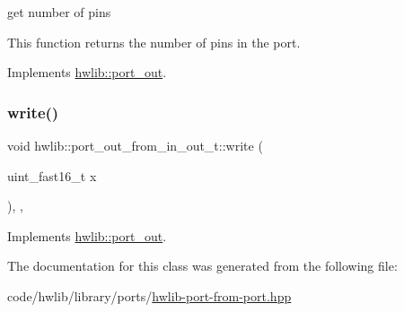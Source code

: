 get number of pins

This function returns the number of pins in the port. 

Implements \hyperlink{classhwlib_1_1port__out_a8593e2ff755b938797defb06c1e085df}{hwlib\+::port\+\_\+out}.

\mbox{\label{classhwlib_1_1port__out__from__in__out__t_acc2b58e61226bcf46f7f4c30c94084ee}} 
\subsubsection{\texorpdfstring{write()}{write()}}
{\footnotesize\ttfamily void hwlib\+::port\+\_\+out\+\_\+from\+\_\+in\+\_\+out\+\_\+t\+::write (\begin{DoxyParamCaption}\item[{uint\+\_\+fast16\+\_\+t}]{x }\end{DoxyParamCaption})\hspace{0.3cm}{\ttfamily [inline]}, {\ttfamily [override]}, {\ttfamily [virtual]}}







Implements \hyperlink{classhwlib_1_1port__out_a3644bf484ebe059ec5bf17fa43e0c01b}{hwlib\+::port\+\_\+out}.



The documentation for this class was generated from the following file\+:\begin{DoxyCompactItemize}
\item 
code/hwlib/library/ports/\hyperlink{hwlib-port-from-port_8hpp}{hwlib-\/port-\/from-\/port.\+hpp}\end{DoxyCompactItemize}

